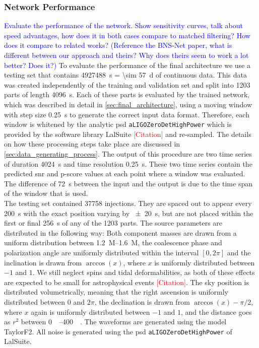 \subsubsection{Network Performance}\label{sec:network_performance}
\textcolor{blue}{Evaluate the performance of the network. Show sensitivity curves, talk about speed advantages, how does it in both cases compare to matched filtering? How does it compare to related works? (Reference the BNS-Net paper, what is different between our approach and theirs? Why does theirs seem to work a lot better? Does it?)}
To evaluate the performance of the final architecture we use a testing set that contains \SI{4927488}{\s} = \SI{\sim 57}{\day} of continuous data. This data was created independently of the training and validation set and split into 1203 parts of length \SI{4096}{\s}. Each of these parts is evaluated by the trained network, which was described in detail in \autoref{sec:final_architecture}, using a moving window with step size \SI{0.25}{\s} to generate the correct input data format. Therefore, each window is whitened by the analytic \gls{psd} \verb|aLIGOZeroDetHighPower| which is provided by the software library LalSuite \textcolor{red}{[Citation]} and re-sampled. The details on how these processing steps take place are discussed in \autoref{sec:data_generating_process}. The output of this procedure are two time series of duration \SI{4024}{\s} and time resolution \SI{0.25}{\s}. These two time series contain the predicted \gls{snr} and p-score values at each point where a window was evaluated. The difference of \SI{72}{\s} between the input and the output is due to the time span of the window that is used.\\
The testing set contained 37758 injections. They are spaced out to appear every \SI{200}{\s} with the exact position varying by \SI{\pm 20}{\s}, but are not placed within the first or final \SI{256}{\s} of any of the 1203 parts. The source parameters are distributed in the following way: Both component masses are drawn from a uniform distribution between \SIrange{1.2}{1.6}{M_\odot}, the coalescence phase and polarization angle are uniformly distributed within the interval $\left[0,2\pi\right]$ and the inclination is drawn from $\arccos(x)$, where $x$ is uniformly distributed between $-1$ and $1$. We still neglect spins and tidal deformabilities, as both of these effects are expected to be small for astrophysical events \textcolor{red}{[Citation]}. The sky position is distributed volumetrically, meaning that the right ascension is uniformly distributed between $0$ and $2\pi$, the declination is drawn from $\arccos(x)-\pi/2$, where $x$ again is uniformly distributed between $-1$ and $1$, and the distance goes as $r^2$ between \SIrange{0}{400}{\mega\parsec}. The waveforms are generated using the model TaylorF2. All noise is generated using the \gls{psd} \verb|aLIGOZeroDetHighPower| of LalSuite.\smallskip\\
